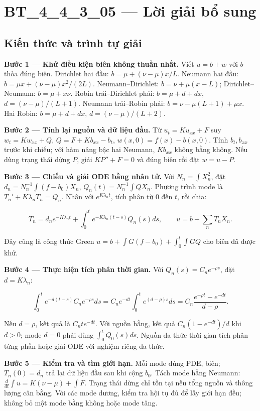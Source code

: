 \documentclass[10pt,a4paper]{article}
\begin{document}
\section*{BT\_4\_4\_3\_05 — Lời giải bổ sung}
\subsection*{Kiến thức và trình tự giải}
\textbf{Bước 1 — Khử điều kiện biên không thuần nhất.} Viết $u=b+w$ với $b$ thỏa đúng biên. Dirichlet hai đầu: $b=\mu+(\nu-\mu)x/L$. Neumann hai đầu: $b=\mu x+(\nu-\mu)x^2/(2L)$. Neumann–Dirichlet: $b=\nu+\mu(x-L)$; Dirichlet–Neumann: $b=\mu+x\nu$. Robin trái–Dirichlet phải: $b=\mu+d+dx$, $d=(\nu-\mu)/(L+1)$. Neumann trái–Robin phải: $b=\nu-\mu(L+1)+\mu x$. Hai Robin: $b=\mu+d+dx$, $d=(\nu-\mu)/(L+2)$.

\textbf{Bước 2 — Tính lại nguồn và dữ liệu đầu.} Từ $u_t=Ku_{xx}+F$ suy $w_t=Kw_{xx}+Q$, $Q=F+Kb_{xx}-b_t$, $w(x,0)=f(x)-b(x,0)$. Tính $b_t,b_{xx}$ trước khi chiếu; với hàm nâng bậc hai Neumann, $Kb_{xx}$ không bằng không. Nếu dùng trạng thái dừng $P$, giải $KP''+F=0$ và đúng biên rồi đặt $w=u-P$.

\textbf{Bước 3 — Chiếu và giải ODE bằng nhân tử.} Với $N_n=\int X_n^2$, đặt $d_n=N_n^{-1}\int(f-b_0)X_n$, $Q_n(t)=N_n^{-1}\int QX_n$. Phương trình mode là $T_n'+K\lambda_nT_n=Q_n$. Nhân với $e^{K\lambda_nt}$, tích phân từ $0$ đến $t$, rồi chia:


\[
T_n=d_ne^{-K\lambda_nt}+\int_0^te^{-K\lambda_n(t-s)}Q_n(s)ds,\qquad
u=b+\sum_nT_nX_n.
\]


Đây cũng là công thức Green $u=b+\int G(f-b_0)+\int_0^t\int GQ$ cho biên đã được khử.

\textbf{Bước 4 — Thực hiện tích phân thời gian.} Với $Q_n(s)=C_ne^{-\rho s}$, đặt $d=K\lambda_n$:


\[
\int_0^te^{-d(t-s)}C_ne^{-\rho s}ds
=C_ne^{-dt}\int_0^te^{(d-\rho)s}ds
=C_n\frac{e^{-\rho t}-e^{-dt}}{d-\rho}.
\]


Nếu $d=\rho$, kết quả là $C_nte^{-dt}$. Với nguồn hằng, kết quả $C_n(1-e^{-dt})/d$ khi $d>0$; mode $d=0$ phải dùng $\int_0^tQ_0(s)ds$. Nguồn đa thức thời gian tích phân từng phần hoặc giải ODE với nghiệm riêng đa thức.

\textbf{Bước 5 — Kiểm tra và tìm giới hạn.} Mỗi mode đúng PDE, biên; $T_n(0)=d_n$ trả lại dữ liệu đầu sau khi cộng $b_0$. Tách mode hằng Neumann: $\frac d{dt}\int u=K(\nu-\mu)+\int F$. Trạng thái dừng chỉ tồn tại nếu tổng nguồn và thông lượng cân bằng. Với các mode dương, kiểm tra hội tụ đủ để lấy giới hạn đều; không bỏ một mode bằng không hoặc mode tăng.
\end{document}
